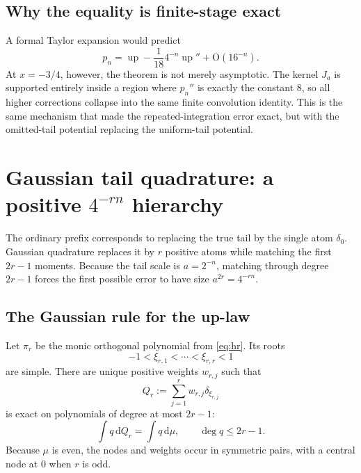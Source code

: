 \documentclass[11pt]{article}
\numberwithin{equation}{section}
\theoremstyle{definition}
\theoremstyle{remark}
\newcommand{\Up}{\operatorname{up}}
\newcommand{\dd}{\,\mathrm d}
\newcommand{\Oh}{\mathrm O}
\begin{document}
\subsection{Why the equality is finite-stage exact}

A formal Taylor expansion would predict
\[
 p_n=\Up-\frac1{18}4^{-n}\Up''+\Oh(16^{-n}).
\]
At $x=-3/4$, however, the theorem is not merely asymptotic.  The kernel $J_a$ is supported entirely inside a region where $p_n''$ is exactly the constant $8$, so all higher corrections collapse into the same finite convolution identity.  This is the same mechanism that made the repeated-integration error exact, but with the omitted-tail potential replacing the uniform-tail potential.

\section{Gaussian tail quadrature: a positive $4^{-rn}$ hierarchy}
\label{sec:gaussian}

The ordinary prefix corresponds to replacing the true tail by the single atom $\delta_0$.  Gaussian quadrature replaces it by $r$ positive atoms while matching the first $2r-1$ moments.  Because the tail scale is $a=2^{-n}$, matching through degree $2r-1$ forces the first possible error to have size $a^{2r}=4^{-rn}$.

\subsection{The Gaussian rule for the up-law}

Let $\pi_r$ be the monic orthogonal polynomial from \eqref{eq:hr}.  Its roots
\begin{equation}
 -1<\xi_{r,1}<\cdots<\xi_{r,r}<1
 \label{eq:gauss-nodes}
\end{equation}
are simple.  There are unique positive weights $w_{r,j}$ such that
\begin{equation}
 Q_r:=\sum_{j=1}^{r}w_{r,j}\delta_{\xi_{r,j}}
 \label{eq:Qr}
\end{equation}
is exact on polynomials of degree at most $2r-1$:
\begin{equation}
 \int q\dd Q_r=\int q\dd\mu,
 \qquad \deg q\le2r-1.
 \label{eq:Gauss-exactness}
\end{equation}
Because $\mu$ is even, the nodes and weights occur in symmetric pairs, with a central node at $0$ when $r$ is odd.
\end{document}
